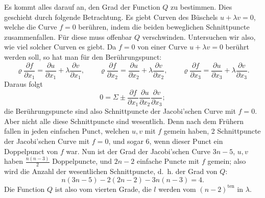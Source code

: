 \documentclass[10pt]{article}
\begin{document}
Es kommt alles darauf an, den Grad der Function \(Q\) zu bestimmen. Dies geschieht durch folgende Betrachtung. Es giebt Curven des Büschels \(u+\lambda v=0\), welche die Curve \(f=0\) berühren, indem die beiden beweglichen Schnittpuncte zusammenfallen. Für diese muss offenbar \(Q\) verschwinden. Untersuchen wir also, wie viel solcher Curven es giebt. Da \(f=0\) von einer Curve \(u+\lambda v=0\) berührt werden soll, so hat man für den Berührungspunct:
\[
\varrho\frac{\partial f}{\partial x_1}=\frac{\partial u}{\partial x_1}+\lambda\frac{\partial v}{\partial x_1},\qquad
\varrho\frac{\partial f}{\partial x_2}=\frac{\partial u}{\partial x_2}+\lambda\frac{\partial v}{\partial x_2},\qquad
\varrho\frac{\partial f}{\partial x_3}=\frac{\partial u}{\partial x_3}+\lambda\frac{\partial v}{\partial x_3}.
\]
Daraus folgt
\[
0=\Sigma\pm \frac{\partial f}{\partial x_1}\frac{\partial u}{\partial x_2}\frac{\partial v}{\partial x_3};
\]
die Berührungspuncte sind also Schnittpuncte der Jacobi'schen Curve mit \(f=0\). Aber nicht alle diese Schnittpuncte sind wesentlich. Denn nach dem Frühern fallen in jeden einfachen Punct, welchen \(u,v\) mit \(f\) gemein haben, 2 Schnittpuncte der Jacobi'schen Curve mit \(f=0\), und sogar 6, wenn dieser Punct ein Doppelpunct von \(f\) war. Nun ist der Grad der Jacobi'schen Curve \(3n-5\), \(u,v\) haben \(\frac{n(n-3)}{2}\) Doppelpuncte, und \(2n-2\) einfache Puncte mit \(f\) gemein; also wird die Anzahl der wesentlichen Schnittpuncte, d.\ h. der Grad von \(Q\):
\[
n(3n-5)-2(2n-2)-3n(n-3)=4.
\]
Die Function \(Q\) ist also vom vierten Grade, die \(l\) werden vom \((n-2)^{\text{ten}}\) in \(\lambda\).
\end{document}
